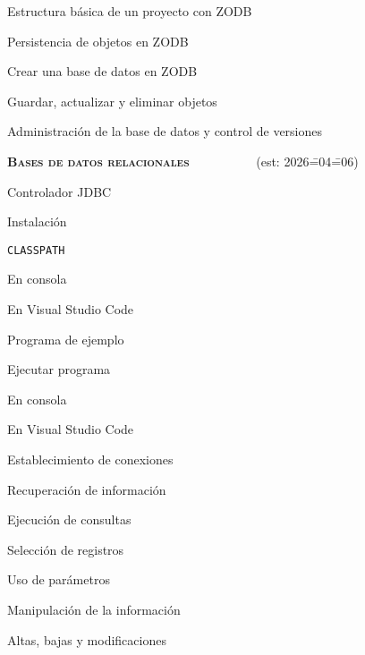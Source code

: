 \begin{longenum}
\begin{longenum}
\begin{longenum}
\begin{longenum}
                \item Estructura básica de un proyecto con ZODB
            \end{longenum}
            \item Persistencia de objetos en ZODB
            \begin{longenum}
                \item Crear una base de datos en ZODB
                \item Guardar, actualizar y eliminar objetos
                \item Administración de la base de datos y control de versiones
            \end{longenum}
        \end{longenum}
    \end{longenum}
    \item \textbf{\textsc{Bases de datos relacionales}} \ \ \ \ \ \ \ \dual\ \ \ (est: 2026\==04\==06)
    \begin{longenum}
        \item Controlador JDBC
        \begin{longenum}
            \item Instalación
            \item \texttt{CLASSPATH}
            \begin{longenum}
                \item En consola
                \item En Visual Studio Code
            \end{longenum}
        \end{longenum}
        \item Programa de ejemplo
        \item Ejecutar programa
        \begin{longenum}
            \item En consola
            \item En Visual Studio Code
        \end{longenum}
        \item Establecimiento de conexiones
        \item Recuperación de información
        \begin{longenum}
            \item Ejecución de consultas
            \item Selección de registros
            \item Uso de parámetros
        \end{longenum}
        \item Manipulación de la información
        \begin{longenum}
            \item Altas, bajas y modificaciones
        \end{longenum}
    \end{longenum}
\end{longenum}
